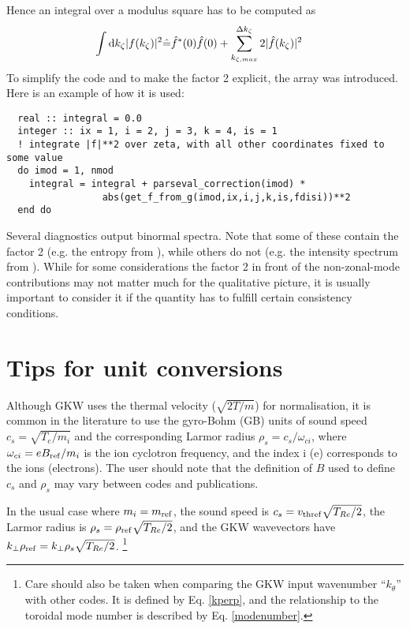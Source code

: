Hence an integral over a modulus square has to be computed as
\begin{align}
  \int \mathrm{d} k_\zeta |f(k_\zeta)|^2 &\hat{=} 
\hat f^*(0) \hat f(0) + 
\sum_{k_{\zeta,max}}^{\Delta k_\zeta} 2 |\hat f(k_\zeta)|^2
\end{align}
To simplify the code and to make the factor 2 explicit,
the array  was introduced. Here is an
example of how it is used:
\begin{verbatim}
  real :: integral = 0.0
  integer :: ix = 1, i = 2, j = 3, k = 4, is = 1
  ! integrate |f|**2 over zeta, with all other coordinates fixed to some value
  do imod = 1, nmod
    integral = integral + parseval_correction(imod) * 
                 abs(get_f_from_g(imod,ix,i,j,k,is,fdisi))**2
  end do
\end{verbatim}

Several diagnostics output binormal spectra. Note that some of these
contain the factor 2 (e.g. the entropy  from
), while others do not (e.g. the intensity
spectrum  from ).  While for some
considerations the factor 2 in front of the non-zonal-mode
contributions may not matter much for the qualitative picture, it is
usually important to consider it if the quantity has to fulfill
certain consistency conditions.


\section{Tips for unit conversions}

Although GKW uses the thermal velocity ($ \sqrt{2 T /m}$) for normalisation, it is common 
in the literature to use the gyro-Bohm (GB) units of sound speed $c_s = \sqrt{T_e / m_i}$ and the
corresponding Larmor radius $\rho_s = c_s / \omega_{ci}$, where $\omega_{ci} = e B_{\rm ref} / m_i$ is the ion
cyclotron frequency, and the index i (e) corresponds to the ions (electrons).  
The user should note that the definition of $B$ used to define $c_s$ and $\rho_s$ may vary between codes and publications.

In the usual case where
$m_i=m_{\rm ref}$, the sound speed is $c_s=v_{\rm
thref}\sqrt{T_{Re}/2}$, the Larmor radius is $\rho_s=\rho_{\rm ref}\sqrt{T_{Re}/2}$, and the GKW
wavevectors have $k_\perp \rho_{\rm ref} = k_\perp \rho_s\sqrt{T_{Re}/2}$.
\footnote{Care should also be taken when comparing the GKW input wavenumber ``$k_\theta$''
with other codes. It is defined by Eq. \ref{kperp}, and the relationship
to the toroidal mode number is described by Eq. \ref{modenumber}.}  

